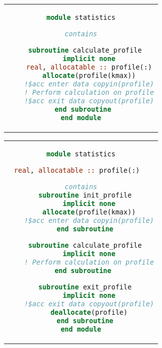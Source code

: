 \begin{figure}[H]
  \centering
  \label{lst:memory_allocation}
  \begin{adjustbox}{valign=t, minipage=0.48\linewidth}
    \centering
    \begin{tabular}{c}
      \begin{lstlisting}[language=Fortran]
module statistics

contains

  subroutine calculate_profile
    implicit none
    real, allocatable :: profile(:)
    allocate(profile(kmax))
    !$acc enter data copyin(profile)
    ! Perform calculation on profile
    !$acc exit data copyout(profile)
  end subroutine 
end module
      \end{lstlisting}
    \end{tabular}
  \end{adjustbox}
  \hfill
  \begin{adjustbox}{valign=t, minipage=0.48\linewidth}
    \centering
    \begin{tabular}{c}
      \begin{lstlisting}[language=Fortran]
module statistics

real, allocatable :: profile(:)  

contains
  subroutine init_profile
    implicit none
    allocate(profile(kmax))
    !$acc enter data copyin(profile)
  end subroutine

  subroutine calculate_profile
    implicit none
    ! Perform calculation on profile
  end subroutine 

  subroutine exit_profile
    implicit none
    !$acc exit data copyout(profile)
    deallocate(profile)
  end subroutine
end module
      \end{lstlisting}
    \end{tabular}
  \end{adjustbox}
\end{figure}

